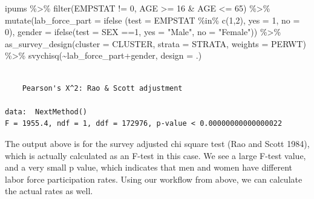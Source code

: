 \documentclass[
  letterpaper,
  DIV=11,
  numbers=noendperiod]{scrreprt}
\newenvironment{Shaded}{\begin{snugshade}}{\end{snugshade}}
\newcommand{\AttributeTok}[1]{\textcolor[rgb]{0.40,0.45,0.13}{#1}}
\newcommand{\DecValTok}[1]{\textcolor[rgb]{0.68,0.00,0.00}{#1}}
\newcommand{\FunctionTok}[1]{\textcolor[rgb]{0.28,0.35,0.67}{#1}}
\newcommand{\NormalTok}[1]{\textcolor[rgb]{0.00,0.23,0.31}{#1}}
\newcommand{\SpecialCharTok}[1]{\textcolor[rgb]{0.37,0.37,0.37}{#1}}
\newcommand{\StringTok}[1]{\textcolor[rgb]{0.13,0.47,0.30}{#1}}
\begin{document}
\begin{Shaded}
\begin{Highlighting}[]
\NormalTok{ipums }\SpecialCharTok{\%\textgreater{}\%}
  \FunctionTok{filter}\NormalTok{(EMPSTAT }\SpecialCharTok{!=} \DecValTok{0}\NormalTok{,}
\NormalTok{         AGE }\SpecialCharTok{\textgreater{}=} \DecValTok{16} \SpecialCharTok{\&}\NormalTok{ AGE }\SpecialCharTok{\textless{}=} \DecValTok{65}\NormalTok{) }\SpecialCharTok{\%\textgreater{}\%}
  \FunctionTok{mutate}\NormalTok{(}\AttributeTok{lab\_force\_part =} \FunctionTok{ifelse}\NormalTok{ (}\AttributeTok{test =}\NormalTok{ EMPSTAT }\SpecialCharTok{\%in\%} \FunctionTok{c}\NormalTok{(}\DecValTok{1}\NormalTok{,}\DecValTok{2}\NormalTok{),}
                                  \AttributeTok{yes =} \DecValTok{1}\NormalTok{,}
                                  \AttributeTok{no =} \DecValTok{0}\NormalTok{), }
         \AttributeTok{gender =} \FunctionTok{ifelse}\NormalTok{(}\AttributeTok{test =}\NormalTok{ SEX }\SpecialCharTok{==}\DecValTok{1}\NormalTok{,}
                         \AttributeTok{yes =} \StringTok{"Male"}\NormalTok{,}
                         \AttributeTok{no =} \StringTok{"Female"}\NormalTok{)) }\SpecialCharTok{\%\textgreater{}\%}
  \FunctionTok{as\_survey\_design}\NormalTok{(}\AttributeTok{cluster =}\NormalTok{ CLUSTER,}
                   \AttributeTok{strata =}\NormalTok{ STRATA,}
                   \AttributeTok{weights =}\NormalTok{ PERWT) }\SpecialCharTok{\%\textgreater{}\%}
  \FunctionTok{svychisq}\NormalTok{(}\SpecialCharTok{\textasciitilde{}}\NormalTok{lab\_force\_part}\SpecialCharTok{+}\NormalTok{gender,}
                    \AttributeTok{design =}\NormalTok{ .)}
\end{Highlighting}
\end{Shaded}

\begin{verbatim}

    Pearson's X^2: Rao & Scott adjustment

data:  NextMethod()
F = 1955.4, ndf = 1, ddf = 172976, p-value < 0.00000000000000022
\end{verbatim}

The output above is for the survey adjusted chi square test (Rao and
Scott 1984), which is actually calculated as an F-test in this case. We
see a large F-test value, and a very small p value, which indicates that
men and women have different labor force participation rates. Using our
workflow from above, we can calculate the actual rates as well.
\end{document}
